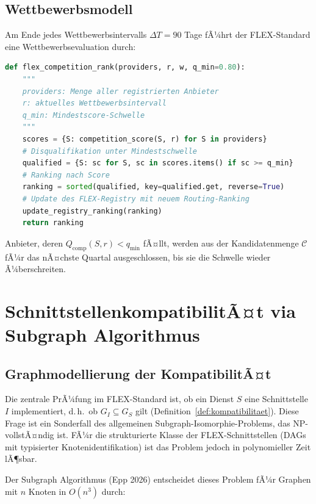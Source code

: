 ﻿\documentclass[a4paper,12pt]{article}
\theoremstyle{definition}
\begin{document}
\subsection{Wettbewerbsmodell}

Am Ende jedes Wettbewerbsintervalls $\Delta T = 90$ Tage fÃ¼hrt der FLEX-Standard eine Wettbewerbsevaluation durch:

\begin{lstlisting}[caption={FLEX-COMPETITION-RANK: Wettbewerbsrankierung},label={alg:wettbewerb},language=Python]
def flex_competition_rank(providers, r, w, q_min=0.80):
    """
    providers: Menge aller registrierten Anbieter
    r: aktuelles Wettbewerbsintervall
    q_min: Mindestscore-Schwelle
    """
    scores = {S: competition_score(S, r) for S in providers}
    # Disqualifikation unter Mindestschwelle
    qualified = {S: sc for S, sc in scores.items() if sc >= q_min}
    # Ranking nach Score
    ranking = sorted(qualified, key=qualified.get, reverse=True)
    # Update des FLEX-Registry mit neuem Routing-Ranking
    update_registry_ranking(ranking)
    return ranking
\end{lstlisting}

Anbieter, deren $Q_\mathrm{comp}(S, r) < q_{\min}$ fÃ¤llt, werden aus der Kandidatenmenge $\mathcal{C}$ fÃ¼r das nÃ¤chste Quartal ausgeschlossen, bis sie die Schwelle wieder Ã¼berschreiten.

\section{SchnittstellenkompatibilitÃ¤t via Subgraph Algorithmus}
\label{sec:subgraph}

\subsection{Graphmodellierung der KompatibilitÃ¤t}

Die zentrale PrÃ¼fung im FLEX-Standard ist, ob ein Dienst $S$ eine Schnittstelle $I$ implementiert, d.\,h.\ ob $G_I \subseteq G_S$ gilt (Definition~\ref{def:kompatibilitaet}). Diese Frage ist ein Sonderfall des allgemeinen Subgraph-Isomorphie-Problems, das NP-vollstÃ¤ndig ist. FÃ¼r die strukturierte Klasse der FLEX-Schnittstellen (DAGs mit typisierter Knotenidentifikation) ist das Problem jedoch in polynomieller Zeit lÃ¶sbar.

Der Subgraph Algorithmus (Epp 2026) \cite{epp2026} entscheidet dieses Problem fÃ¼r Graphen mit $n$ Knoten in $O(n^3)$ durch:
\end{document}
